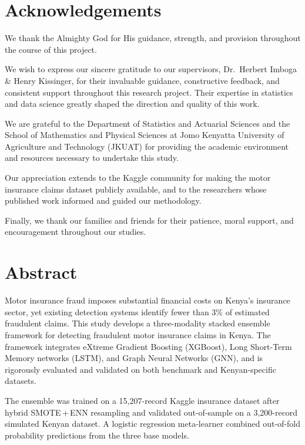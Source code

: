 \documentclass[12pt,a4paper,oneside]{report}
\numberwithin{equation}{chapter}
\begin{document}
\chapter*{Acknowledgements}

We thank the Almighty God for His guidance, strength, and provision throughout the course of this project.

We wish to express our sincere gratitude to our supervisors, Dr.\ Herbert Imboga \& Henry Kissinger,  for their invaluable guidance, constructive feedback, and consistent support throughout this research project. Their expertise in statistics and data science greatly shaped the direction and quality of this work.

We are grateful to the Department of Statistics and Actuarial Sciences and the School of Mathematics and Physical Sciences at Jomo Kenyatta University of Agriculture and Technology (JKUAT) for providing the academic environment and resources necessary to undertake this study.

Our appreciation extends to the Kaggle community for making the motor insurance claims dataset publicly available, and to the researchers whose published work informed and guided our methodology.


Finally, we thank our families and friends for their patience, moral support, and encouragement throughout our studies.
\newpage
\chapter*{Abstract}

Motor insurance fraud imposes substantial financial costs on Kenya's insurance sector, yet existing
detection systems identify fewer than 3\% of estimated fraudulent claims. This study develops a
three-modality stacked ensemble framework for detecting fraudulent motor insurance claims in
Kenya. The framework integrates eXtreme Gradient Boosting (XGBoost), Long Short-Term Memory
networks (LSTM), and Graph Neural Networks (GNN), and is rigorously evaluated and validated on
both benchmark and Kenyan-specific datasets.

The ensemble was trained on a 15,207-record Kaggle insurance dataset after hybrid
SMOTE\,+\,ENN resampling and validated out-of-sample on a 3,200-record simulated Kenyan
dataset. A logistic regression meta-learner combined out-of-fold probability predictions from the
three base models.
\end{document}
